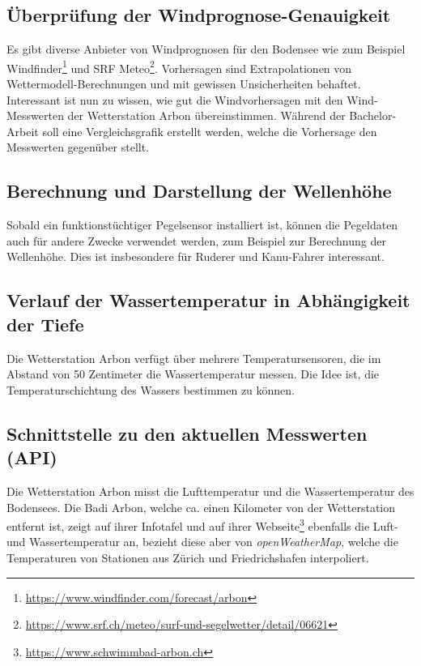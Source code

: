 \subsection{Überprüfung der Windprognose-Genauigkeit }
Es gibt diverse Anbieter von Windprognosen für den Bodensee wie zum Beispiel Windfinder\footnote{ \url{https://www.windfinder.com/forecast/arbon}} und SRF Meteo\footnote{ \url{https://www.srf.ch/meteo/surf-und-segelwetter/detail/06621}}. Vorhersagen sind Extrapolationen von Wettermodell-Berechnungen und mit gewissen Unsicherheiten behaftet. Interessant ist nun zu wissen, wie gut die Windvorhersagen mit den Wind-Messwerten der Wetterstation Arbon übereinstimmen. Während der Bachelor-Arbeit soll eine Vergleichsgrafik erstellt werden, welche die Vorhersage den Messwerten gegenüber stellt.


\subsection{Berechnung und Darstellung der Wellenhöhe}
Sobald ein funktionstüchtiger Pegelsensor installiert ist, können die Pegeldaten auch für andere Zwecke verwendet werden, zum Beispiel zur Berechnung der Wellenhöhe. Dies ist insbesondere für Ruderer und Kanu-Fahrer interessant.


\subsection{Verlauf der Wassertemperatur in Abhängigkeit der Tiefe}
Die Wetterstation Arbon verfügt über mehrere Temperatursensoren, die im Abstand von 50 Zentimeter die Wassertemperatur messen. Die Idee ist, die Temperaturschichtung des Wassers bestimmen zu können.


\subsection{Schnittstelle zu den aktuellen Messwerten (API)}
Die Wetterstation Arbon misst die Lufttemperatur und die Wassertemperatur des Bodensees. Die Badi Arbon, welche ca. einen Kilometer von der Wetterstation entfernt ist, zeigt auf ihrer Infotafel und auf ihrer Webseite\footnote{ \url{https://www.schwimmbad-arbon.ch}} ebenfalls die Luft- und Wassertemperatur an, bezieht diese aber von \textit{openWeatherMap}, welche die Temperaturen von Stationen aus Zürich und Friedrichshafen interpoliert. 
\newline

